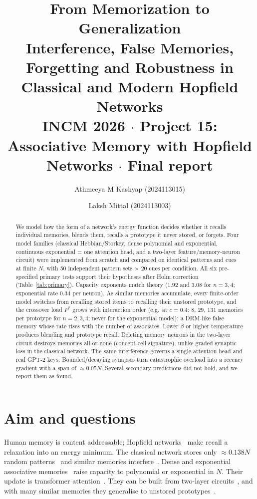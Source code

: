 \documentclass[10pt,a4paper]{article}
\title{\textbf{From Memorization to Generalization}\\[2pt]
\large Interference, False Memories, Forgetting and Robustness in Classical and Modern Hopfield Networks\\[2pt]
\normalsize INCM 2026 $\cdot$ Project 15: Associative Memory with Hopfield Networks $\cdot$ Final report}
\author{Athmeeya M Kashyap (2024113015) \and Laksh Mittal (2024113003)}
\date{}
\begin{document}
\maketitle

\begin{abstract}
We model how the form of a network's energy function decides whether it recalls individual memories,
blends them, recalls a prototype it never stored, or forgets. Four model families (classical Hebbian/Storkey,
dense polynomial and exponential, continuous exponential = one attention head, and a two-layer
feature/memory-neuron circuit) were implemented from scratch and compared on identical patterns and
cues at finite $N$, with 50 independent pattern sets $\times$ 20 cues per condition. All six pre-specified
primary tests support their hypotheses after Holm correction (Table~\ref{tab:primary}).
Capacity exponents match theory ($1.92$ and $3.08$ for $n=3,4$; exponential rate $0.34$ per neuron).
As similar memories accumulate, every finite-order model switches from recalling stored items to recalling
their unstored prototype, and the crossover load $P^*$ grows with interaction order (e.g.\ at $c=0.4$:
$8$, $29$, $131$ memories per prototype for $n=2,3,4$; never for the exponential model): a DRM-like false
memory whose rate rises with the number of associates. Lower $\beta$ or higher temperature produces blending and prototype
recall. Deleting memory neurons in the two-layer circuit destroys memories all-or-none (concept-cell
signature), unlike graded synaptic loss in the classical network. The same interference governs a single
attention head and real GPT-2 keys. Bounded/decaying synapses turn catastrophic overload into a recency
gradient with a span of $\approx0.05N$. Several secondary predictions did not hold, and we report them as found.
\end{abstract}

\section{Aim and questions}
Human memory is content addressable; Hopfield networks~\cite{hopfield82} make recall a relaxation into
an energy minimum. The classical network stores only $\approx0.138N$ random patterns~\cite{amit85,amit87}
and similar memories interfere~\cite{fontanari90}. Dense and exponential associative memories~\cite{krotov16,demircigil17}
raise capacity to polynomial or exponential in $N$. Their update is transformer attention~\cite{ramsauer21}.
They can be built from two-layer circuits~\cite{krotov21}, and with many similar memories they generalise to
unstored prototypes~\cite{ambrogioni24,pham25}.
\end{document}
